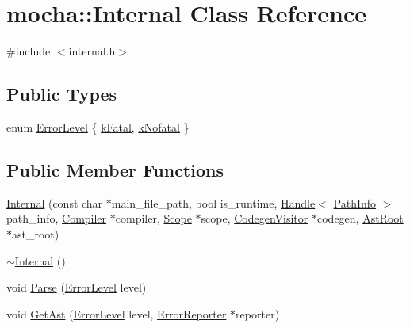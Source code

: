 \hypertarget{classmocha_1_1_internal}{
\section{mocha::Internal Class Reference}
\label{classmocha_1_1_internal}
}


{\ttfamily \#include $<$internal.h$>$}

\subsection*{Public Types}
\begin{DoxyCompactItemize}
\item 
enum \hyperlink{classmocha_1_1_internal_afbba1f8f92938ca06cc3411b328995e9}{ErrorLevel} \{ \hyperlink{classmocha_1_1_internal_afbba1f8f92938ca06cc3411b328995e9aed1aa64d26393f649c81a31a4df3e3f1}{kFatal}, 
\hyperlink{classmocha_1_1_internal_afbba1f8f92938ca06cc3411b328995e9af4ee95016bc3475b5e36686e7913cc4c}{kNofatal}
 \}
\end{DoxyCompactItemize}
\subsection*{Public Member Functions}
\begin{DoxyCompactItemize}
\item 
\hyperlink{classmocha_1_1_internal_abc425250c2a39b6118764ba09a8cb766}{Internal} (const char $\ast$main\_\-file\_\-path, bool is\_\-runtime, \hyperlink{classmocha_1_1_handle}{Handle}$<$ \hyperlink{classmocha_1_1_path_info}{PathInfo} $>$ path\_\-info, \hyperlink{classmocha_1_1_compiler}{Compiler} $\ast$compiler, \hyperlink{classmocha_1_1_scope}{Scope} $\ast$scope, \hyperlink{classmocha_1_1_codegen_visitor}{CodegenVisitor} $\ast$codegen, \hyperlink{classmocha_1_1_ast_root}{AstRoot} $\ast$ast\_\-root)
\item 
\hyperlink{classmocha_1_1_internal_a359b80aabe55b3c5274f6aa285847c64}{$\sim$Internal} ()
\item 
void \hyperlink{classmocha_1_1_internal_a4e41be482c9ff17b9abbaae0c3f19212}{Parse} (\hyperlink{classmocha_1_1_internal_afbba1f8f92938ca06cc3411b328995e9}{ErrorLevel} level)
\item 
void \hyperlink{classmocha_1_1_internal_ac154a96f8dde1b4404c5e9bc9482b3dc}{GetAst} (\hyperlink{classmocha_1_1_internal_afbba1f8f92938ca06cc3411b328995e9}{ErrorLevel} level, \hyperlink{classmocha_1_1_error_reporter}{ErrorReporter} $\ast$reporter)
\end{DoxyCompactItemize}
